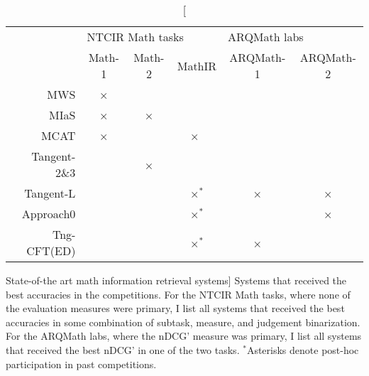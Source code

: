 \begin{table}
\centering
\begin{tabular}{@{}rccccc@{}}
\toprule
             & \multicolumn{3}{l}{NTCIR Math tasks} & \multicolumn{2}{l}{ARQMath labs} \\
             & Math-1 & Math-2 & MathIR             & ARQMath-1 & ARQMath-2            \\
\midrule
MWS          &    ×   &        &                    &           &                      \\
MIaS         &    ×   &    ×   &                    &           &                      \\
MCAT         &    ×   &        &    ×$\phantom{^{\text{*}}}$ &  &                      \\
Tangent-2\&3 &        &    ×   &                    &           &                      \\
Tangent-L    &        &        &    ×$^{\text{*}}$  &    ×      &     ×                \\
Approach0    &        &        &    ×$^{\text{*}}$  &           &     ×                \\
Tng-CFT(ED)  &        &        &    ×$^{\text{*}}$  &    ×      &                      \\
\bottomrule
\end{tabular}
\caption
  [State-of-the art math information retrieval systems]%
  {Systems that received the best accuracies in the competitions.
   For the NTCIR Math tasks, where none of the evaluation measures were
   primary, I list all systems that received the best accuracies in some
   combination of subtask, measure, and judgement binarization. For the ARQMath
   labs, where the nDCG' measure was primary, I list all systems that received
   the best nDCG' in one of the two tasks. $^{\text{*}}$Asterisks denote
   post-hoc participation in past competitions.}
\label{tab:systems}
\end{table}

